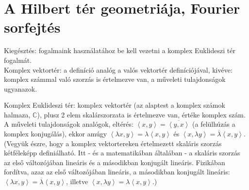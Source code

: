 \documentclass[12pt,a4paper]{scrartcl}
\begin{document}
\hypertarget{a-hilbert-ter-geometriaja-fourier-sorfejtes}{%
\section{A Hilbert tér geometriája, Fourier
sorfejtés}\label{a-hilbert-ter-geometriaja-fourier-sorfejtes}}

Kiegésztés: fogalmaink használatához be kell vezetni a komplex
Euklideszi tér fogalmát.\\
Komplex vektortér: a definíció analóg a valós vektortér definíciójával,
kivéve: komplex számmal való szorzás is értelmezve van, a műveleti
tulajdonságok ugyanazok.

Komplex Euklideszi tér: komplex vektortér (az alaptest a komplex számok
halmaza, \(\mathbb{C}\)), plusz 2 elem skalárszorzata is értelmezve van,
értéke komplex szám. A műveleti tulajdonságok analógok, eltérés:
\(\left\langle {x,y} \right\rangle = \overline{\left\langle {y,x} \right\rangle}\)
(a felülhúzás a komplex konjugálás), ekkor amúgy
\(\left\langle {\lambda x,y} \right\rangle = \lambda\left\langle {x,y} \right\rangle\)
és
\(\left\langle {x,\lambda y} \right\rangle = \overline{\lambda}\left\langle {x,y} \right\rangle\).
(Vegyük észre, hogy a komplex vektortereken értelmezett skaláris szorzás
kétféleképp definiálható. Itt - és a matematikában általában - a
skaláris szorzás az első változójában lineáris és a másodikban konjugált
lineáris. Fizikában fordítva, azaz az első változójában lineáris, a
másodikban konjugált
lineáris:\(\left\langle {\lambda x,y} \right\rangle = \overline{\lambda}\left\langle {x,y} \right\rangle\),
illetve
\(\left\langle {x,\lambda y} \right\rangle = \lambda\left\langle {x,y} \right\rangle\).)
\end{document}
